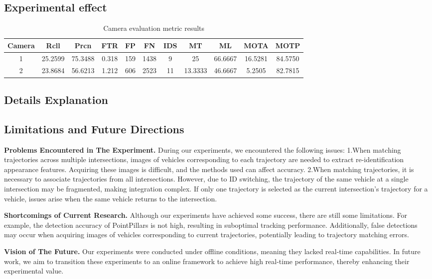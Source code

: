 \subsection{Experimental effect}

\begin{table*}[t] 
	\centering
	\caption{Camera evaluation metric results}
	\label{tab:example}
	\begin{tabular}{ccccccccccc}
		\toprule
		Camera & Rcll & Prcn & FTR & FP & FN & IDS & MT & ML & MOTA & MOTP\\
		\midrule
		1 & 25.2599 & 75.3488 & 0.318 & 159 & 1438 & 9 & 25 & 66.6667 & 16.5281 & 84.5750\\
		2 & 23.8684 & 56.6213 & 1.212 & 606 & 2523 & 11 & 13.3333 & 46.6667 & 5.2505 & 82.7815\\
		\bottomrule
	\end{tabular}
\end{table*}

\subsection{Details Explanation}


\subsection{Limitations and Future Directions}

\textbf{Problems Encountered in The Experiment.}
During our experiments, we encountered the following issues:  
1.When matching trajectories across multiple intersections, images of vehicles corresponding to each trajectory are needed to extract re-identification appearance features. 
Acquiring these images is difficult, and the methods used can affect accuracy.  
2.When matching trajectories, it is necessary to associate trajectories from all intersections. 
However, due to ID switching, the trajectory of the same vehicle at a single intersection may be fragmented, making integration complex. 
If only one trajectory is selected as the current intersection's trajectory for a vehicle, issues arise when the same vehicle returns to the intersection.

\textbf{Shortcomings of Current Research.}
Although our experiments have achieved some success, there are still some limitations. 
For example, the detection accuracy of PointPillars is not high, resulting in suboptimal tracking performance. 
Additionally, false detections may occur when acquiring images of vehicles corresponding to current trajectories, potentially leading to trajectory matching errors.

\textbf{Vision of The Future.}
Our experiments were conducted under offline conditions, meaning they lacked real-time capabilities. 
In future work, we aim to transition these experiments to an online framework to achieve high real-time performance, thereby enhancing their experimental value.